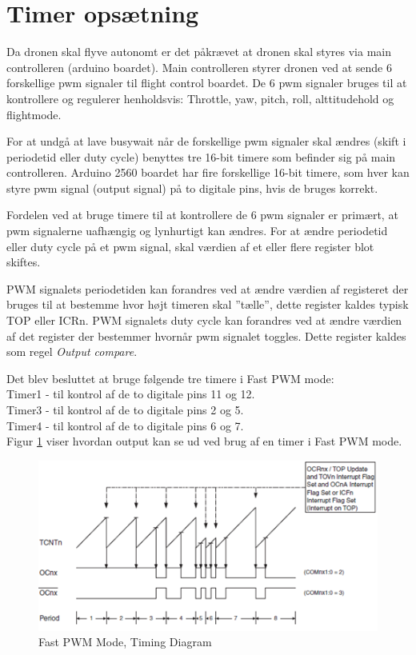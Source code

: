 \section{Timer opsætning}

Da dronen skal flyve autonomt er det påkrævet at dronen skal styres via main controlleren (arduino boardet). Main controlleren styrer dronen ved at sende 6 forskellige pwm signaler til flight control boardet. De 6 pwm signaler bruges til at kontrollere og regulerer henholdsvis: Throttle, yaw, pitch, roll, alttitudehold og flightmode.

For at undgå at lave busywait når de forskellige pwm signaler skal ændres (skift i periodetid eller duty cycle) benyttes tre 16-bit timere som befinder sig på main controlleren. Arduino 2560 boardet har fire forskellige 16-bit timere, som hver kan styre pwm signal (output signal) på to digitale pins, hvis de  bruges korrekt. 

Fordelen ved at bruge timere til at kontrollere de 6 pwm signaler er primært, at pwm signalerne uafhængig og lynhurtigt kan ændres. For at ændre periodetid eller duty cycle på et pwm signal, skal værdien af et eller flere register blot skiftes. 

PWM signalets periodetiden kan forandres ved at ændre værdien af registeret der bruges til at bestemme hvor højt timeren skal ”tælle”, dette register kaldes typisk TOP eller ICRn. 
PWM signalets duty cycle kan forandres ved at ændre værdien af det register der bestemmer hvornår pwm signalet toggles. Dette register kaldes som regel \textit{Output compare}.

Det blev besluttet at bruge følgende tre timere i Fast PWM mode: \\
Timer1 - til kontrol af de to digitale pins 11 og 12.\\
Timer3 -  til kontrol af de to digitale pins 2 og 5.\\
Timer4 - til kontrol af de to digitale pins 6 og 7. \\

Figur \ref{fig:Timing_diagram} viser hvordan output kan se ud ved brug af en timer i Fast PWM mode.  

\begin{figure}[H]
	\centering
	\includegraphics[width=1.\textwidth]{Billeder/Timer/0_timing_diagram.png}
	\caption{Fast PWM Mode, Timing Diagram}
	\label{fig:Timing_diagram}
\end{figure}

